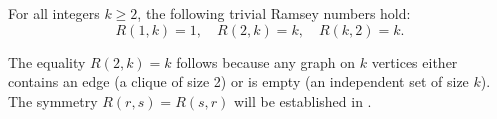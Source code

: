 \begin{proposition} \label{proposition:trivial_ramsey_numbers_R_2_k_equals_k_and_R_k_2_equals_k}
For all integers $k \geq 2$, the following trivial Ramsey numbers hold:
$$R(1,k) = 1, \quad R(2,k) = k, \quad R(k,2) = k.$$

The equality $R(2,k) = k$ follows because any graph on $k$ vertices either contains an edge (a clique of size 2) or is empty (an independent set of size $k$). The symmetry $R(r,s) = R(s,r)$ will be established in .
\end{proposition}
